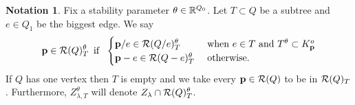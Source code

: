 \documentclass{amsart}
\theoremstyle{definition}
\newtheorem{notn}[thm]{Notation}
\begin{document}
\begin{notn}\label{notn:intree}
Fix a stability parameter $\theta \in \mathbb{R}^{Q_0}$. Let $T \subset Q$ be a subtree and $e\in Q_1$ be the biggest edge. We say 
$$\mathbf{p} \in \mathcal{R}(Q)_T^\theta \,\text{ if }\,\,\begin{cases} \mathbf{p}/e \in \mathcal{R}(Q/e)_T^\theta & \text{ when } e \in T \text{ and } T^\theta \subset K_{\mathbf{p}}^o \\ \mathbf{p}-e \in \mathcal{R}(Q-e)_T^\theta & \text{ otherwise}.\end{cases}$$
If $Q$ has one vertex then $T$ is empty and we take every $\mathbf{p} \in \mathcal{R}(Q)$ to be in $\mathcal{R}(Q)_T$.
Furthermore, $Z_{\lambda,T}^\theta$ will denote $Z_{\lambda} \cap \mathcal{R}(Q)_T^\theta$.
\end{notn}
\end{document}
